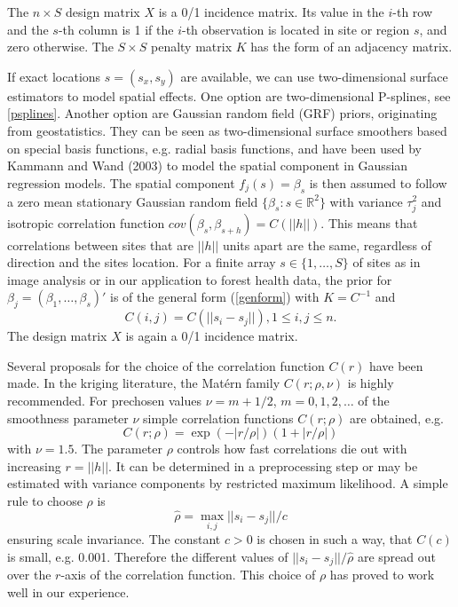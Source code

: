 \documentclass[11pt,a4paper,twoside]{bayesxarticle}
\begin{document}
The $n \times S$ design matrix $X$ is a 0/1 incidence matrix. Its
value in the $i$-th row and the $s$-th column is 1 if the $i$-th
observation is located in site or region $s$, and zero otherwise.
The $S \times S$ penalty matrix $K$ has the form of an adjacency
matrix.

If exact locations $s=(s_x,s_y)$ are available, we can use
two-dimensional surface estimators to model spatial effects. One
option are two-dimensional P-splines, see \autoref{psplines}.
Another option are Gaussian random field (GRF) priors, originating
from geostatistics. They can be seen as two-dimensional surface
smoothers based on special basis functions, e.g. radial basis
functions, and have been used by Kammann and Wand (2003) to model
the spatial component in Gaussian regression models. The spatial
component $f_{j}(s)=\beta_s$ is then assumed to follow a zero
mean stationary Gaussian random field
$\{\beta_s:s\in\mathbb{R}^2\}$ with variance $\tau_{j}^2$ and
isotropic correlation function
$cov(\beta_s,\beta_{s+h})=C(||h||)$. This means that correlations
between sites that are $||h||$ units apart are the same,
regardless of direction and the sites location. For a finite array
$s\in\{1,\ldots,S\}$ of sites as in image analysis or in our
application to forest health data, the prior for
$\beta_j=(\beta_1,\ldots,\beta_s)'$ is of the general form
(\ref{genform}) with $K=C^{-1}$ and
\[C(i,j)=C(||s_i-s_j||), 1\le i,j\le n.\]
The design matrix $X$ is again a 0/1 incidence matrix.

Several proposals for the choice of the correlation function
$C(r)$ have been made. In the kriging literature, the Mat\'{e}rn
family $C(r;\rho,\nu)$ is highly recommended. For prechosen values $\nu=m+1/2$,
$m=0,1,2,\ldots$ of the smoothness parameter $\nu$ simple
correlation functions $C(r;\rho)$ are obtained, e.g.
\[C(r;\rho)=\exp(-|r/\rho|)(1+|r/\rho|)\]
with $\nu=1.5$. The parameter $\rho$ controls how fast
correlations die out with increasing $r=||h||$. It can be
determined in a preprocessing step or may be estimated with
variance components by restricted maximum likelihood. A simple
rule to choose $\rho$ is
\[\hat{\rho}=\max_{i,j}||s_i-s_j||/c\]
ensuring scale invariance. The constant $c>0$ is chosen in such a
way, that $C(c)$ is small, e.g. 0.001. Therefore the different
values of $||s_i-s_j||/\hat{\rho}$ are spread out over the
$r$-axis of the correlation function. This choice of $\rho$ has
proved to work well in our experience.
\end{document}
